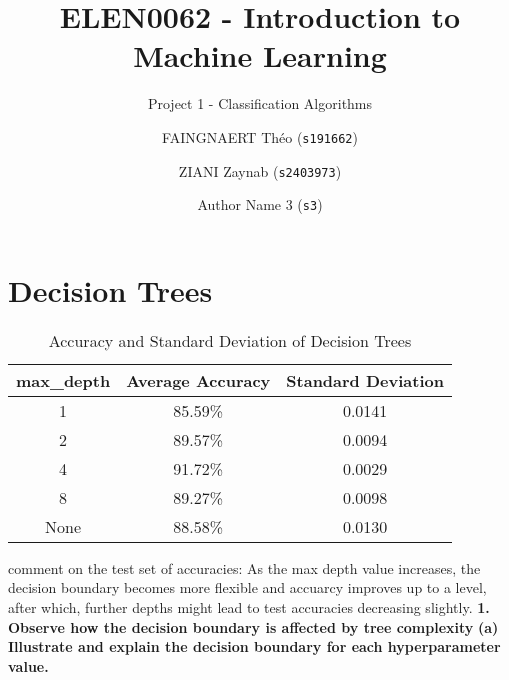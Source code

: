\documentclass[acmconf,nonacm=true]{acmart}
\begin{document}
\title{ELEN0062 - Introduction to Machine Learning}
\subtitle{Project 1 - Classification Algorithms}

\author{FAINGNAERT Théo (\texttt{s191662})}
\author{ZIANI Zaynab (\texttt{s2403973})}
\author{Author Name 3 (\texttt{s3})}

\maketitle

\section{Decision Trees}

\begin{table}[H]
    \centering
    \caption{Accuracy and Standard Deviation of Decision Trees}
    \begin{tabular}{|c|c|c|}
    \hline
     max\_depth & Average Accuracy & Standard Deviation \\
    \hline
    1 & 85.59\%&  0.0141\\
    2 & 89.57\%&  0.0094\\
    4 & 91.72\%&  0.0029\\
    8 & 89.27\%&  0.0098\\
    None & 88.58\%&  0.0130\\
    \hline
    \end{tabular}
\end{table}
comment on the test set of accuracies: 
As the max depth value increases, the decision boundary becomes more flexible and accuarcy improves up to a level, after which, further depths might lead to test accuracies decreasing slightly.
\textbf{1. Observe how the decision boundary is affected by tree complexity}
\textbf{(a) Illustrate and explain the decision boundary for each hyperparameter value.}
\end{document}
